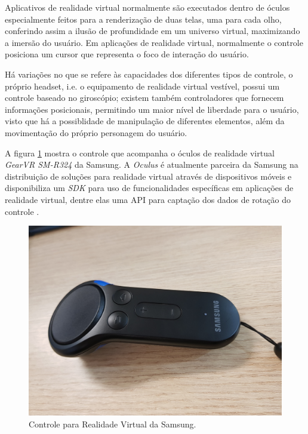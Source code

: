 \documentclass[conference]{IEEEtran}
\begin{document}
Aplicativos de realidade virtual normalmente são executados dentro de óculos especialmente feitos para a renderização de duas telas, uma para cada olho, conferindo assim a ilusão de profundidade em um universo virtual, maximizando a imersão do usuário. Em aplicações de realidade virtual, normalmente o controle posiciona um cursor que representa o foco de interação do usuário.

Há variações no que se refere às capacidades dos diferentes tipos de controle, o próprio headset, i.e. o equipamento de realidade virtual vestível, possui um controle baseado no giroscópio; existem também controladores que fornecem informações posicionais, permitindo um maior nível de liberdade para o usuário, visto que há a possiblidade de manipulação de diferentes elementos, além da movimentação do próprio personagem do usuário.

A figura \ref{figure:vrcontroller} mostra o controle que acompanha o óculos de realidade virtual \textit{GearVR SM-R324} da Samsung. A \textit{Oculus} é atualmente parceira da Samsung na distribuição de soluções para realidade virtual através de dispositivos móveis e disponibiliza um \textit{SDK} para uso de funcionalidades específicas em aplicações de realidade virtual, dentre elas uma API para captação dos dados de rotação do controle \cite{gearvrinputdocs}.

\begin{figure}[h!]
\includegraphics[width=\linewidth]{images/gear_controller.jpg}
\caption{Controle para Realidade Virtual da Samsung.}
\label{figure:vrcontroller}
\end{figure}
\end{document}
